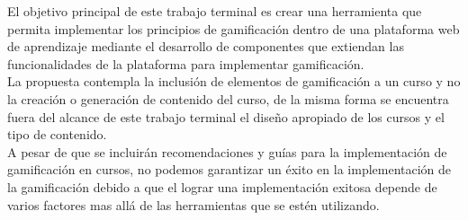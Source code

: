  El objetivo principal de este trabajo terminal es crear una herramienta que permita
 implementar los principios de gamificación dentro de una plataforma web de aprendizaje
 mediante el desarrollo de componentes que extiendan las funcionalidades de la 
 plataforma para implementar gamificación.\\

 \noindent La propuesta contempla la inclusión de elementos de gamificación
 a un curso y no la creación o generación de contenido del curso, de la misma forma
 se encuentra fuera del alcance de este trabajo terminal el diseño apropiado de los
 cursos y el tipo de contenido.\\

 \noindent A pesar de que se incluirán recomendaciones y guías para la implementación
 de gamificación en cursos, no podemos garantizar un éxito en la implementación de 
 la gamificación debido a que el lograr una implementación exitosa depende de varios
 factores mas allá de las herramientas que se estén utilizando.

